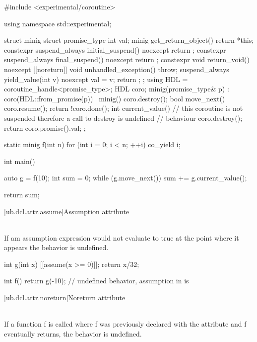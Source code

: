 \pnum
\begin{example}
\begin{codeblock}
#include <experimental/coroutine>

using namespace std::experimental;

struct minig {
  struct promise_type {
    int val;
    minig get_return_object() { return {*this}; }
    constexpr suspend_always initial_suspend() noexcept { return {}; }
    constexpr suspend_always final_suspend() noexcept { return {}; }
    constexpr void return_void() noexcept {}
    [[noreturn]] void unhandled_exception() { throw; }
    suspend_always yield_value(int v) noexcept {
      val = v;
      return {};
    }
  };
  using HDL = coroutine_handle<promise_type>;
  HDL coro;
  minig(promise_type& p) : coro(HDL::from_promise(p)) {}
  ~minig() { coro.destroy(); }
  bool move_next() {
    coro.resume();
    return !coro.done();
  }
  int current_value() {
    // this coroutine is not suspended therefore a call to destroy is undefined
    // behaviour
    coro.destroy();
    return coro.promise().val;
  }
};

static minig f(int n) {
  for (int i = 0; i < n; ++i)
    co_yield i;
}

int main() {
  auto g = f(10);
  int sum = 0;
  while (g.move_next())
    sum += g.current_value();

  return sum;
}
\end{codeblock}
\end{example}

[ub.dcl.attr.assume]{Assumption attribute}

\pnum
{} \\
If am assumption expression would not evaluate to true at the point where it
appears the behavior is undefined.

\pnum
\begin{example}
\begin{codeblock}
int g(int x) {
  [[assume(x >= 0)]];
  return x/32;
}

int f() {
    return g(-10);      // undefined behavior, assumption in  is 
}
\end{codeblock}
\end{example}


[ub.dcl.attr.noreturn]{Noreturn attribute}

\pnum
{} \\
If a function f is called where f was previously declared with the  attribute and f eventually returns,
the behavior is undefined.

